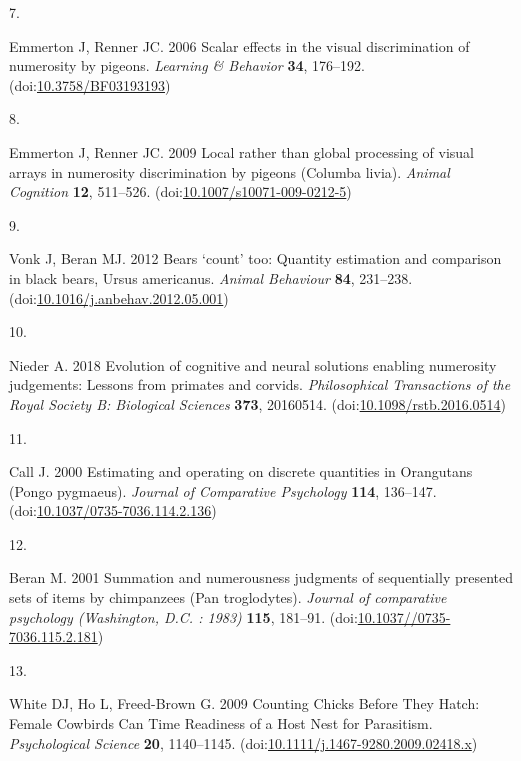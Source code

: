 \documentclass[
  ,doc,floatsintext]{apa6}
\newlength{\cslhangindent}
\newlength{\csllabelwidth}
\newlength{\cslentryspacingunit} %
\newenvironment{CSLReferences}[2] %
 {%
  \setlength{\parindent}{0pt}
  \ifodd #1
  \let\oldpar\par
  \def\par{\hangindent=\cslhangindent\oldpar}
  \fi
  \setlength{\parskip}{#2\cslentryspacingunit}
 }%
 {}
\newcommand{\CSLLeftMargin}[1]{\parbox[t]{\csllabelwidth}{#1}}
\newcommand{\CSLRightInline}[1]{\parbox[t]{\linewidth - \csllabelwidth}{#1}\break}
\begin{document}
\begin{CSLReferences}{0}{0}
\leavevmode{}%
\CSLLeftMargin{7. }%
\CSLRightInline{Emmerton J, Renner JC. 2006 Scalar effects in the visual discrimination of numerosity by pigeons. \emph{Learning \& Behavior} \textbf{34}, 176--192. (doi:\href{https://doi.org/10.3758/BF03193193}{10.3758/BF03193193})}

\leavevmode{}%
\CSLLeftMargin{8. }%
\CSLRightInline{Emmerton J, Renner JC. 2009 Local rather than global processing of visual arrays in numerosity discrimination by pigeons ({Columba} livia). \emph{Animal Cognition} \textbf{12}, 511--526. (doi:\href{https://doi.org/10.1007/s10071-009-0212-5}{10.1007/s10071-009-0212-5})}

\leavevmode{}%
\CSLLeftMargin{9. }%
\CSLRightInline{Vonk J, Beran MJ. 2012 Bears {`count'} too: Quantity estimation and comparison in black bears, {Ursus} americanus. \emph{Animal Behaviour} \textbf{84}, 231--238. (doi:\href{https://doi.org/10.1016/j.anbehav.2012.05.001}{10.1016/j.anbehav.2012.05.001})}

\leavevmode{}%
\CSLLeftMargin{10. }%
\CSLRightInline{Nieder A. 2018 Evolution of cognitive and neural solutions enabling numerosity judgements: Lessons from primates and corvids. \emph{Philosophical Transactions of the Royal Society B: Biological Sciences} \textbf{373}, 20160514. (doi:\href{https://doi.org/10.1098/rstb.2016.0514}{10.1098/rstb.2016.0514})}

\leavevmode{}%
\CSLLeftMargin{11. }%
\CSLRightInline{Call J. 2000 Estimating and operating on discrete quantities in {Orangutans} ({Pongo} pygmaeus). \emph{Journal of Comparative Psychology} \textbf{114}, 136--147. (doi:\href{https://doi.org/10.1037/0735-7036.114.2.136}{10.1037/0735-7036.114.2.136})}

\leavevmode{}%
\CSLLeftMargin{12. }%
\CSLRightInline{Beran M. 2001 Summation and numerousness judgments of sequentially presented sets of items by chimpanzees ({Pan} troglodytes). \emph{Journal of comparative psychology (Washington, D.C. : 1983)} \textbf{115}, 181--91. (doi:\href{https://doi.org/10.1037//0735-7036.115.2.181}{10.1037//0735-7036.115.2.181})}

\leavevmode{}%
\CSLLeftMargin{13. }%
\CSLRightInline{White DJ, Ho L, Freed-Brown G. 2009 Counting {Chicks} {Before} {They} {Hatch}: {Female} {Cowbirds} {Can} {Time} {Readiness} of a {Host} {Nest} for {Parasitism}. \emph{Psychological Science} \textbf{20}, 1140--1145. (doi:\href{https://doi.org/10.1111/j.1467-9280.2009.02418.x}{10.1111/j.1467-9280.2009.02418.x})}


\end{CSLReferences}
\end{document}
